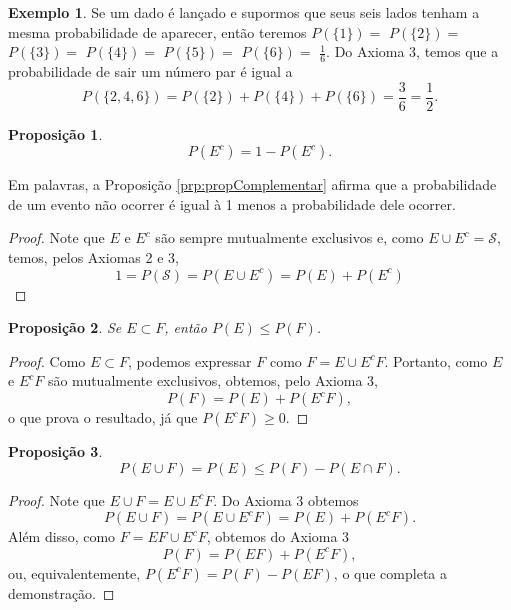 \documentclass[]{book}
\newtheorem{proposition}{Proposição}[chapter]
\theoremstyle{definition}
\theoremstyle{definition}
\newtheorem{example}{Exemplo}[chapter]
\theoremstyle{definition}
\theoremstyle{remark}
\begin{document}
\begin{example}
\protect\hypertarget{exm:unnamed-chunk-95}{}{\label{exm:unnamed-chunk-95} }Se um dado é lançado e supormos que seus seis lados tenham a mesma probabilidade de aparecer, então teremos \(P(\{1\})=\) \(P(\{2\})=\) \(P(\{3\})=\) \(P(\{4\})=\) \(P(\{5\})=\) \(P(\{6\})=\) \(\frac{1}{6}\).
Do Axioma 3, temos que a probabilidade de sair um número par é igual a
\[P(\{2,4,6\}) = P(\{ 2 \})+P(\{ 4 \})+P(\{ 6 \}) = \frac{3}{6} = \frac{1}{2}.\]
\end{example}

\begin{proposition}
\protect\hypertarget{prp:propComplementar}{}{\label{prp:propComplementar} }\[P(E^c) = 1 - P(E^c).\]
\end{proposition}

Em palavras, a Proposição \ref{prp:propComplementar} afirma que a probabilidade de um evento não ocorrer é igual à 1 menos a probabilidade dele ocorrer.

\begin{proof}
\iffalse{} {Prova. } \fi{}Note que \(E\) e \(E^c\) são sempre mutualmente exclusivos e, como \(E\cup E^c=\mathcal{S}\), temos, pelos Axiomas 2 e 3,
\[1 = P(\mathcal{S}) = P(E\cup E^c) = P(E) + P(E^c)\]
\end{proof}

\begin{proposition}
\protect\hypertarget{prp:propProbSubConjunto}{}{\label{prp:propProbSubConjunto} }Se \(E \subset F\), então \(P(E) \leq P(F)\).
\end{proposition}

\begin{proof}
\iffalse{} {Prova. } \fi{}Como \(E \subset F\), podemos expressar \(F\) como \(F = E \cup E^c F\).
Portanto, como \(E\) e \(E^c F\) são mutualmente exclusivos, obtemos, pelo Axioma 3,
\[P(F) = P(E) + P(E^c F),\]
o que prova o resultado, já que \(P( E^c F)\geq 0\).
\end{proof}

\begin{proposition}
\protect\hypertarget{prp:propProbUniao}{}{\label{prp:propProbUniao} }\[P(E \cup F) = P(E) \leq P(F) - P(E\cap F).\]
\end{proposition}

\begin{proof}
\iffalse{} {Prova. } \fi{}Note que \(E \cup F = E \cup E^c F\).
Do Axioma 3 obtemos
\[P(E \cup F) = P(E \cup E^c F) = P(E) + P(E^c F).\]
Além disso, como \(F = EF\cup E^c F\), obtemos do Axioma 3
\[P(F) = P(EF) + P(E^c F),\]
ou, equivalentemente, \(P(E^c F) = P(F) - P(EF)\), o que completa a demonstração.
\end{proof}
\end{document}
